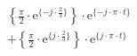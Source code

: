 \correct
\[
\begin{split}
&  \left \{ \frac{\pi}{2} \cdot \textrm{e}^{\{-j \cdot \frac{2}{3} \}} \right \} \cdot \textrm{e}^{\{- j \cdot \pi \cdot t \}}\\
& +\left \{ \frac{\pi}{2} \cdot \textrm{e}^{\{ j \cdot \frac{2}{3} \}} \right \} \cdot \textrm{e}^{\{  j \cdot \pi \cdot t \}}
\end{split}
\]
